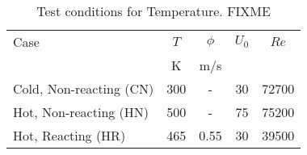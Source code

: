 \begin{table}
  \caption[Test conditions for Preheat Temperature]{Test conditions for Temperature. FIXME}
  \begin{center}
    \begin{tabular}{lcccc}
      Case & \(T\) & \(\phi\) & \(U_0\) & \(Re\) \tabularnewline
      & K & m/s & & \tabularnewline
      \hline\hline
      Cold, Non-reacting (CN) & 300 & - & 30 & 72700 \tabularnewline
      Hot, Non-reacting (HN) & 500 & - & 75 & 75200 \tabularnewline
      Hot, Reacting (HR) & 465 & 0.55 & 30 & 39500 \tabularnewline
      \hline
    \end{tabular}
  \end{center}
  \label{tab:temperatureCases}
\end{table}

